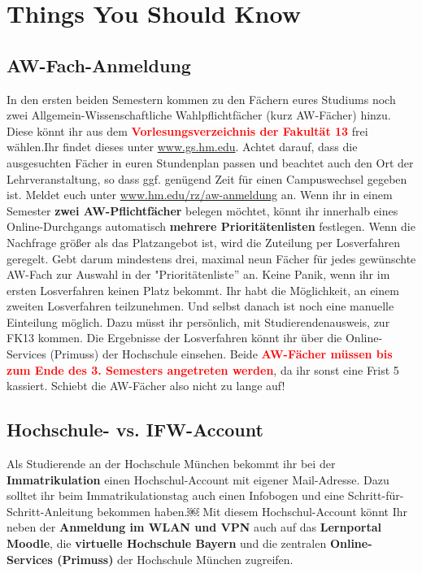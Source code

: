 \section{Things You Should Know}

\subsection{AW-Fach-Anmeldung}

In den ersten beiden Semestern kommen zu den Fächern eures Studiums noch zwei Allgemein-Wissenschaftliche Wahlpflichtfächer (kurz AW-Fächer) hinzu. Diese könnt ihr aus dem \textcolor{red}{\textbf{Vorlesungsverzeichnis der Fakultät 13}} frei wählen.Ihr findet dieses unter \url{www.gs.hm.edu}. Achtet darauf, dass die ausgesuchten Fächer in euren Stundenplan passen und beachtet auch den Ort der Lehrveranstaltung, so dass ggf. genügend Zeit für einen Campuswechsel gegeben ist.\doublebreak
Meldet euch unter \url{www.hm.edu/rz/aw-anmeldung} an.\doublebreak
Wenn ihr in einem Semester \textbf{zwei AW-Pflichtfächer} belegen möchtet, könnt ihr innerhalb eines Online-Durchgangs automatisch \textbf{mehrere Prioritätenlisten} festlegen. Wenn die Nachfrage größer als das Platzangebot ist, wird die Zuteilung per Losverfahren geregelt. Gebt darum mindestens drei, maximal neun Fächer für jedes gewünschte AW-Fach zur Auswahl in der "Prioritätenliste'' an. Keine Panik, wenn ihr im ersten Losverfahren keinen Platz bekommt. Ihr habt die Möglichkeit, an einem zweiten Losverfahren teilzunehmen. Und selbst danach ist noch eine manuelle Einteilung möglich. Dazu müsst ihr persönlich, mit Studierendenausweis, zur FK13 kommen.\doublebreak
Die Ergebnisse der Losverfahren könnt ihr über die Online-Services (Primuss) der Hochschule einsehen.\doublebreak
Beide \textcolor{red}{\textbf{AW-Fächer müssen bis zum Ende des 3. Semesters angetreten werden}}, da ihr sonst eine Frist 5 kassiert. Schiebt die AW-Fächer also nicht zu lange auf! 

\subsection{Hochschule- vs. IFW-Account}

Als Studierende an der Hochschule München bekommt ihr bei der \textbf{Immatrikulation} einen Hochschul-Account mit eigener Mail-Adresse. Dazu solltet ihr beim Immatrikulationstag auch einen Infobogen und eine Schritt-für-Schritt-Anleitung bekommen haben.\doublebreak￼
Mit diesem Hochschul-Account könnt Ihr neben der \textbf{Anmeldung im WLAN und VPN} auch auf das \textbf{Lernportal Moodle}, die \textbf{virtuelle Hochschule Bayern} und die zentralen \textbf{Online-Services (Primuss)} der Hochschule München zugreifen.


